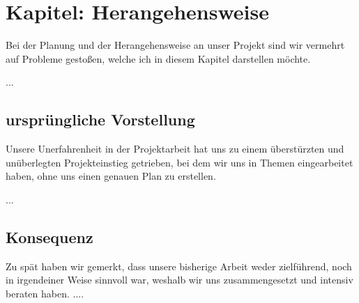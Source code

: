 \documentclass[12pt,a4paper,bibliography=totocnumbered,listof=totocnumbered]{scrartcl}
\begin{document}

\renewcommand{\sectionmark}[1]{\markright{#1}}
\renewcommand{\subsectionmark}[1]{}
\renewcommand{\subsubsectionmark}[1]{}
\rhead{\rightmark}

\onehalfspacing
\renewcommand{\thesection}{\arabic{section}}
\renewcommand{\theHsection}{\arabic{section}}
\setcounter{section}{0}
\setcounter{page}{1}

\section{Kapitel: Herangehensweise}
Bei der Planung und der Herangehensweise an unser Projekt sind wir vermehrt auf Probleme gestoßen, welche ich
in diesem Kapitel darstellen möchte.

...
\subsection{ursprüngliche Vorstellung}
Unsere Unerfahrenheit in der Projektarbeit hat uns zu einem überstürzten und unüberlegten Projekteinstieg getrieben, bei dem wir uns in Themen eingearbeitet haben, ohne uns einen genauen Plan zu erstellen.

...
\subsection{Konsequenz}
Zu spät haben wir gemerkt, dass unsere bisherige Arbeit weder zielführend, noch in irgendeiner Weise sinnvoll war, weshalb wir uns zusammengesetzt und intensiv beraten haben.
....
\end{document}
